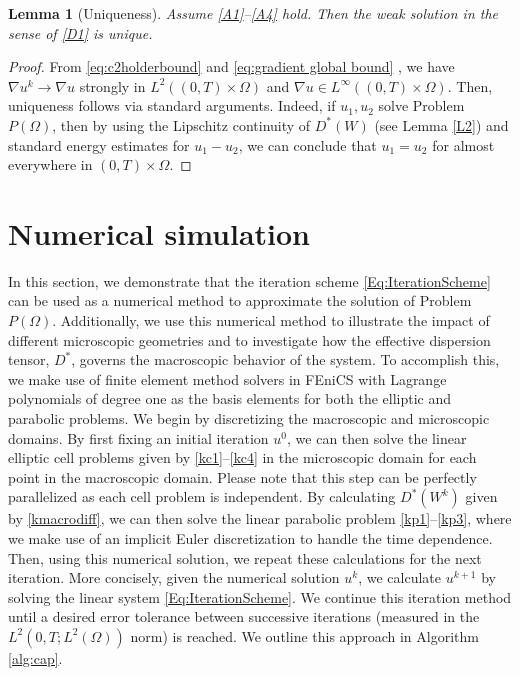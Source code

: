 \documentclass[11pt]{article}
\newtheorem{lemma}{Lemma}
\newcommand{\timeint}{(0,T)}
\begin{document}
\begin{lemma}[Uniqueness]\label{lemma:uniq}
    Assume \ref{A1}--\ref{A4} hold. Then the weak solution in the sense of \cref{D1} is unique.
\end{lemma}
\begin{proof}
    From \eqref{eq:c2holderbound} and \eqref{eq:gradient global bound} , we have $\nabla u^k\to \nabla u$ strongly in $L^2(\timeint\times \Omega)$ and $\nabla u\in{L^{\infty}(\timeint\times\Omega)}.$
  Then, uniqueness follows via standard arguments.
  Indeed, if $u_1,u_2$ solve Problem $P(\Omega)$, then by using the Lipschitz continuity of $D^*(W)$ (see Lemma \eqref{L2}) and standard energy estimates for $u_1-u_2$, we can conclude that $u_1=u_2$ for almost everywhere in $\timeint\times\Omega$.
  \end{proof}
\section{Numerical simulation}\label{section_simulation}
In this section, we demonstrate that the iteration scheme \eqref{Eq:IterationScheme} can be used as a numerical method to approximate the solution of Problem $P(\Omega)$. 
Additionally, we use this numerical method to illustrate the impact of different microscopic geometries and to investigate how the effective dispersion tensor, $D^*$, governs the macroscopic behavior of the system. 
To accomplish this, we make use of finite element method solvers in FEniCS \cite{logg2012automated,Langtangen2016} with Lagrange polynomials of degree one as the basis elements for both the elliptic and parabolic problems. 
We begin by discretizing the macroscopic and microscopic domains.
By first fixing an initial iteration $u^0$, we can then solve the linear elliptic cell problems given by \eqref{kc1}--\eqref{kc4} in the microscopic domain for each point in the macroscopic domain. 
Please note that this step can be perfectly parallelized as each cell problem is independent. 
By calculating $D^*(W^k)$ given by \eqref{kmacrodiff}, we can then solve the linear parabolic problem \eqref{kp1}--\eqref{kp3}, where we make use of an implicit Euler discretization to handle the time dependence. 
Then, using this numerical solution, we repeat these calculations for the next iteration. 
More concisely, given the numerical solution $u^k$, we calculate $u^{k+1}$ by solving the linear system \eqref{Eq:IterationScheme}. 
We continue this iteration method until a desired error tolerance between successive iterations (measured in the $L^2(0, T; L^2(\Omega))$ norm) is reached.
We outline this approach in Algorithm \ref{alg:cap}. 
\end{document}
